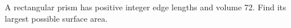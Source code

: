 A rectangular prism has positive integer edge lengths and volume 72. Find its largest possible surface area.
